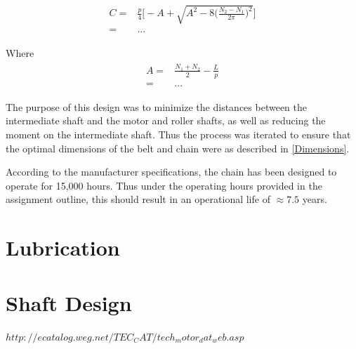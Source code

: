\documentclass[12pt]{article}
\begin{document}
\begin{align} \label{C_min}
    \begin{split}
        C =& \frac{p}{4} \bigg[-A +\sqrt{A^2-8\bigg(\frac{N_2-N_1}{2\pi}\bigg)^2}\Bigg]\\
        =& ...
    \end{split}
\end{align}

Where
\begin{align} \label{A}
    \begin{split}
        A =& \frac{N_1 + N_2}{2} - \frac{L}{p}\\
        =& ...
    \end{split}
\end{align}

The purpose of this design was to minimize the distances between the intermediate shaft and the motor and roller shafts, as well as reducing the moment on the intermediate shaft. Thus the process was iterated to ensure that the optimal dimensions of the belt and chain were as described in \cref{Dimensions}. 

According to the manufacturer specifications, the chain has been designed to operate for 15,000 hours. Thus under the operating hours provided in the assignment outline, this should result in an operational life of $\approx 7.5$ years.

\section{Lubrication}


\section{Shaft Design}



$http://ecatalog.weg.net/TEC_CAT/tech_motor_dat_web.asp$
\end{document}
